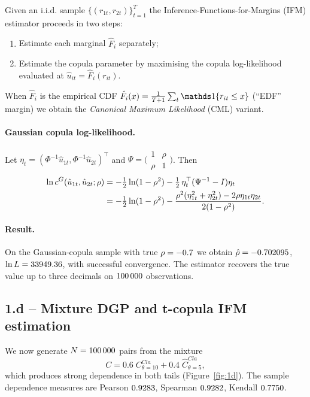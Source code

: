 Given an i.i.d. sample $\{(r_{1t},r_{2t})\}_{t=1}^T$ the Inference-Functions-for-Margins
(IFM) estimator proceeds in two steps:
\begin{enumerate}\setlength\itemsep{0pt}
\item Estimate each marginal $\hat F_i$ separately;
\item Estimate the copula parameter by maximising the copula log-likelihood
      evaluated at $\hat u_{it}=\hat F_i(r_{it})$.
\end{enumerate}
When $\hat F_i$ is the empirical CDF $\hat F_i(x)=\frac{1}{T+1}\sum_t \indic\{r_{it}\le x\}$
(``EDF'' margin) we obtain the \emph{Canonical Maximum Likelihood} (CML) variant.

\paragraph{Gaussian copula log-likelihood.}
Let $\eta_t=(\Phi^{-1}\hat u_{1t},\Phi^{-1}\hat u_{2t})^\top$ and
$\Psi=\bigl(\begin{smallmatrix}1&\rho\\\rho&1\end{smallmatrix}\bigr)$. Then
\begin{align}
\ln c^G(\hat u_{1t},\hat u_{2t};\rho)
&=-\tfrac12\ln(1-\rho^2)
 -\tfrac12\,\eta_t^\top(\Psi^{-1}-I)\eta_t\notag\\
&=-\tfrac12\ln(1-\rho^2)-\frac{\rho^2(\eta_{1t}^2+\eta_{2t}^2)-2\rho\eta_{1t}\eta_{2t}}{2(1-\rho^2)}.
\label{eq:gauss-cop-ll}
\end{align}

\paragraph{Result.} On the Gaussian-copula sample with true $\rho=-0.7$ we obtain
$\hat\rho=-0.702095$, $\ln L=33949.36$, with successful convergence. The
estimator recovers the true value up to three decimals on $100\,000$ observations.

\subsection{1.d -- Mixture DGP and t-copula IFM estimation}

We now generate $N=100\,000$ pairs from the mixture
\[
C=0.6\;C^{Cla}_{\theta=10}+0.4\;\hat C^{Cla}_{\theta=5},
\]
which produces strong dependence in both tails (Figure~\ref{fig:1d}). The
sample dependence measures are Pearson $0.9283$, Spearman
$0.9282$, Kendall $0.7750$.

